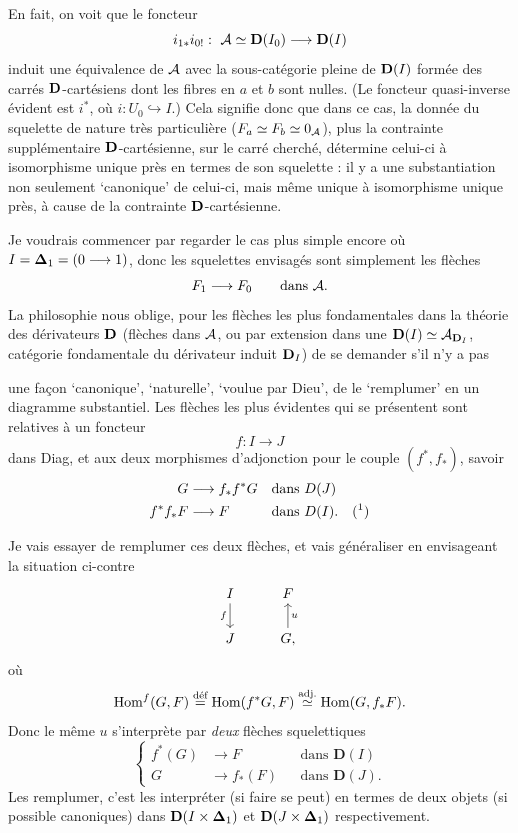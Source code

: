 En fait, on voit que le foncteur
\[
i_{1*}i_{0!} :\ \mathcal{A}\simeq\mathbf{D}(I_0) \longrightarrow \mathbf{D}(I)
\]
induit une équivalence de $\mathcal{A}$ avec la sous-catégorie pleine de $\mathbf{D}(I)$ formée des carrés $\mathbf{D}$-cartésiens dont les fibres en $a$ et $b$ sont nulles. (Le foncteur quasi-inverse évident est $i^*$, où $i : U_0 \hookrightarrow I$.) Cela signifie donc que dans ce cas, la donnée du squelette de nature très particulière ($F_a\simeq F_b\simeq 0_{\mathcal{A}}$), plus la contrainte supplémentaire $\mathbf{D}$-cartésienne, sur le carré cherché, détermine celui-ci à isomorphisme unique près en termes de son squelette : il y a une substantiation non seulement `canonique' de celui-ci, mais même unique à isomorphisme unique près, à cause de la contrainte $\mathbf{D}$-cartésienne.

Je voudrais commencer par regarder le cas plus simple encore où $I=\boldsymbol{\Delta}_1=(0\longrightarrow 1)$, donc les squelettes envisagés sont simplement les flèches
\[
F_1 \longrightarrow F_0 \qquad \text{dans } \mathcal{A}.
\]
La philosophie nous oblige, pour les flèches les plus fondamentales dans la théorie des dérivateurs $\mathbf{D}$ (flèches dans $\mathcal{A}$, ou par extension dans une $\mathbf{D}(I)\simeq\mathcal{A}_{\mathbf{D}_I}$, catégorie fondamentale du dérivateur induit $\mathbf{D}_I$) de se demander s'il n'y a pas

une façon ‘canonique’, ‘naturelle’, ‘voulue par Dieu’, de le ‘remplumer’ en un diagramme substantiel. Les flèches les plus évidentes qui se présentent sont relatives à un foncteur
\[ f : I \longrightarrow J \]
dans Diag, et aux deux morphismes d'adjonction pour le couple $(f^*, f_*)$, savoir
\[
\begin{aligned}
G &\longrightarrow f_*f^*G && \text{dans } D(J)\\
f^*f_*F &\longrightarrow F && \text{dans } D(I). \quad (\text{\footnotemark})
\end{aligned}
\]

Je vais essayer de remplumer ces deux flèches, et vais généraliser en envisageant la situation ci-contre
\[
\begin{tikzcd}
I \arrow[d, "f"'] & F \\
J & G, \arrow[u, "u"']
\end{tikzcd}
\]
où
\[ \mathrm{Hom}^f(G,F) \overset{\text{déf}}{=} \mathrm{Hom}(f^*G,F) \overset{\text{adj.}}{\simeq} \mathrm{Hom}(G,f_*F). \]
Donc le même $u$ s'interprète par \textit{deux} flèches squelettiques
\[
\left\{
\begin{aligned}
f^*(G) &\longrightarrow F && \text{dans } \mathbf{D}(I)\\
G &\longrightarrow f_*(F) && \text{dans } \mathbf{D}(J).
\end{aligned}
\right.
\tag*{(1)}
\]
Les remplumer, c'est les interpréter (si faire se peut) en termes de deux objets (si possible canoniques) dans $\mathbf{D}(I \times \boldsymbol{\Delta}_1)$ et $\mathbf{D}(J \times \boldsymbol{\Delta}_1)$ respectivement.

